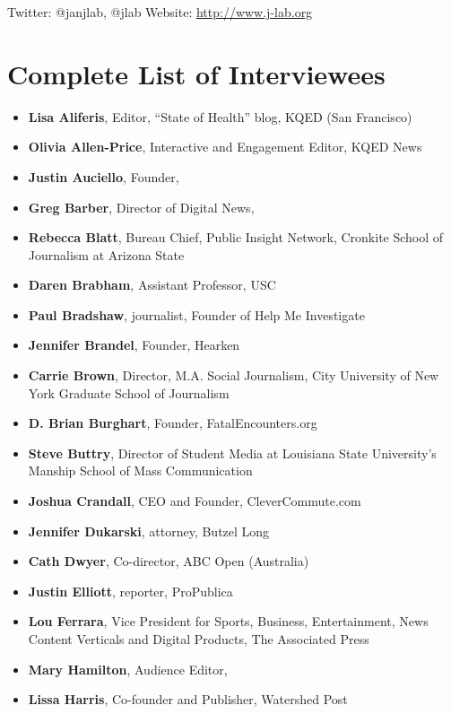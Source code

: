 \begin{itemize}
Twitter: @janjlab, @jlab
Website: \href{http://www.j-lab.org }{http://www.j-lab.org} 


\chapter{Complete List of Interviewees} 

\begin{itemize}
\item \textbf{Lisa Aliferis}, Editor, ``State of Health'' blog, KQED (San Francisco)
\item \textbf{Olivia Allen-Price}, Interactive and Engagement Editor, KQED News
\item \textbf{Justin Auciello}, Founder, 
\item \textbf{Greg Barber}, Director of Digital News, 
\item \textbf{Rebecca Blatt}, Bureau Chief, Public Insight Network, Cronkite School of Journalism at Arizona State
\item \textbf{Daren Brabham}, Assistant Professor, USC
\item \textbf{Paul Bradshaw}, journalist, Founder of Help Me Investigate
\item \textbf{Jennifer Brandel}, Founder, Hearken
\item \textbf{Carrie Brown}, Director, M.A. Social Journalism, City University of New York Graduate School of Journalism
\item \textbf{D. Brian Burghart}, Founder, FatalEncounters.org
\item \textbf{Steve Buttry}, Director of Student Media at Louisiana State University’s Manship School of Mass Communication
\item \textbf{Joshua Crandall}, CEO and Founder, CleverCommute.com
\item \textbf{Jennifer Dukarski}, attorney, Butzel Long
\item \textbf{Cath Dwyer}, Co-director, ABC Open (Australia)
\item \textbf{Justin Elliott}, reporter, ProPublica
\item \textbf{Lou Ferrara}, Vice President for Sports, Business, Entertainment, News Content Verticals and Digital Products, The Associated Press
\item \textbf{Mary Hamilton}, Audience Editor, 
\item \textbf{Lissa Harris}, Co-founder and Publisher, Watershed Post 

\end{itemize}
\end{itemize}
